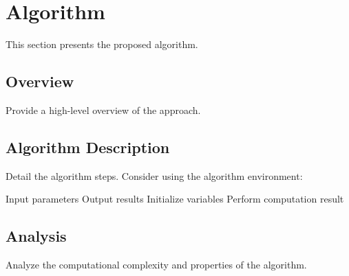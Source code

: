 \section{Algorithm}
\label{sec:algo}

This section presents the proposed algorithm.

\subsection{Overview}
Provide a high-level overview of the approach.

\subsection{Algorithm Description}
Detail the algorithm steps. Consider using the algorithm environment:

\begin{algorithm}
\caption{Your Algorithm Name}
\label{alg:main}
\begin{algorithmic}[1]
\REQUIRE Input parameters
\ENSURE Output results
\STATE Initialize variables
    \STATE Perform computation
\ENDFOR
\RETURN result
\end{algorithmic}
\end{algorithm}

\subsection{Analysis}
Analyze the computational complexity and properties of the algorithm.
